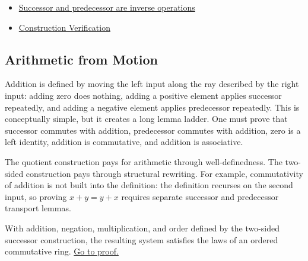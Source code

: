 \begin{dependencies}
\begin{itemize}
  \item \hyperref[thm:two-sided-successor-predecessor-inverses]{Successor and predecessor are inverse operations}
  \item \hyperref[def:number-system-construction-verification]{Construction Verification}
\end{itemize}
\end{dependencies}

\subsection*{Arithmetic from Motion}

\begin{remark*}[Exposition]
Addition is defined by moving the left input along the ray described by the
right input: adding zero does nothing, adding a positive element applies
successor repeatedly, and adding a negative element applies predecessor
repeatedly. This is conceptually simple, but it creates a long lemma ladder.
One must prove that successor commutes with addition, predecessor commutes with
addition, zero is a left identity, addition is commutative, and addition is
associative.
\end{remark*}

\begin{remark*}
The quotient construction pays for arithmetic through well-definedness. The
two-sided construction pays through structural rewriting. For example,
commutativity of addition is not built into the definition: the definition
recurses on the second input, so proving \(x+y=y+x\) requires separate
successor and predecessor transport lemmas.
\end{remark*}

\begin{theorem}
\label{thm:two-sided-integers-ordered-commutative-ring}
With addition, negation, multiplication, and order defined by the two-sided
successor construction, the resulting system satisfies the laws of an ordered
commutative ring.
\hyperref[prf:two-sided-integers-ordered-commutative-ring]{Go to proof.}
\end{theorem}

